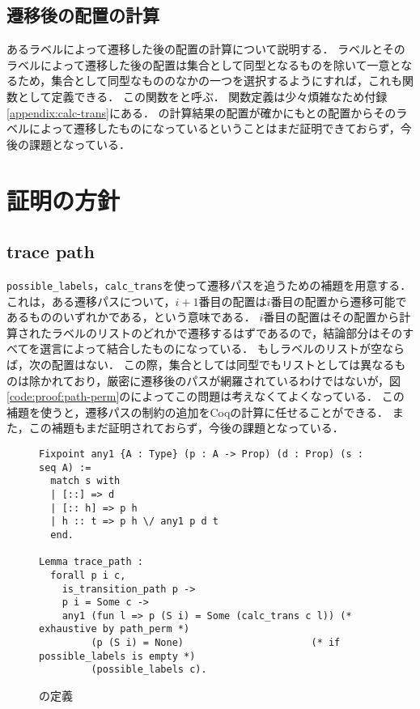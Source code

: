 \subsection{遷移後の配置の計算}

あるラベルによって遷移した後の配置の計算について説明する．
ラベルとそのラベルによって遷移した後の配置は集合として同型となるものを除いて一意となるため，集合として同型なもののなかの一つを選択するようにすれば，これも関数として定義できる．
この関数をと呼ぶ．
関数定義は少々煩雑なため付録\ref{appendix:calc-trans}にある．
の計算結果の配置が確かにもとの配置からそのラベルによって遷移したものになっているということはまだ証明できておらず，今後の課題となっている．

\section{証明の方針}

\subsection{trace path}

\lstinline{possible_labels}，\lstinline{calc_trans}を使って遷移パスを追うための補題を用意する．
これは，ある遷移パスについて，$i + 1$番目の配置は$i$番目の配置から遷移可能であるもののいずれかである，という意味である．
$i$番目の配置はその配置から計算されたラベルのリストのどれかで遷移するはずであるので，結論部分はそのすべてを選言によって結合したものになっている．
もしラベルのリストが空ならば，次の配置はない．
この際，集合としては同型でもリストとしては異なるものは除かれており，厳密に遷移後のパスが網羅されているわけではないが，図\ref{code:proof:path-perm}のによってこの問題は考えなくてよくなっている．
この補題を使うと，遷移パスの制約の追加をCoqの計算に任せることができる．
また，この補題もまだ証明されておらず，今後の課題となっている．


\begin{figure}
\begin{lstlisting}
Fixpoint any1 {A : Type} (p : A -> Prop) (d : Prop) (s : seq A) :=
  match s with
  | [::] => d
  | [:: h] => p h
  | h :: t => p h \/ any1 p d t
  end.

Lemma trace_path :
  forall p i c,
    is_transition_path p ->
    p i = Some c ->
    any1 (fun l => p (S i) = Some (calc_trans c l)) (* exhaustive by path_perm *)
         (p (S i) = None)                      (* if possible_labels is empty *)
         (possible_labels c).
\end{lstlisting}
\caption{の定義}\label{code:proof:trace-path}
\end{figure}

